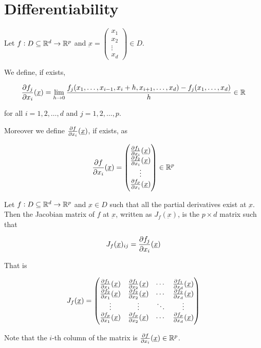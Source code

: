 \documentclass[12pt]{report}
\renewcommand{\vec}[1]{\underbar{\ensuremath{#1}}}
\begin{document}
\section{Differentiability}

\begin{definition}
    Let $f: D \subseteq \mathbb{R}^d \to \mathbb{R}^p$ and $\vec{x} = \begin{pmatrix} x_1 \\ x_2 \\ \vdots \\ x_d \end{pmatrix} \in D$.

    We define, if exists,

    $$
        \pdv{f_j}{x_i}()(\vec{x}) = \lim_{h \to 0} \frac{f_j(x_1, \ldots, x_{i-1}, x_i + h, x_{i+1}, \ldots, x_d) - f_j(x_1, \ldots, x_d)}{h} \in \R
    $$

    for all $i = 1, 2, \ldots, d$ and $j = 1, 2, \ldots, p$.

    Moreover we define $\pdv{f}{x_i}()(\vec{x})$, if exists, as

    $$
        \pdv{f}{x_i}()(\vec{x}) = \begin{pmatrix}
            \pdv{f_1}{x_i}()(\vec{x}) \\
            \pdv{f_2}{x_i}()(\vec{x}) \\
            \vdots                    \\
            \pdv{f_p}{x_i}()(\vec{x})
        \end{pmatrix} \in \R^p
    $$
\end{definition}

\begin{definition}
    Let $f: D \subseteq \mathbb{R}^d \to \mathbb{R}^p$ and $\vec{x} \in D$ such that all the partial derivatives exist at $\vec{x}$.
    Then the Jacobian matrix of $f$ at $\vec{x}$, written as $J_f(\vec{x})$, is the $p \times d$ matrix such that

    $$
        J_f(\vec{x})_{ij} = \pdv{f_j}{x_i}()(\vec{x})
    $$

    That is

    $$
        J_f(\vec{x}) = \begin{pmatrix}
            \pdv{f_1}{x_1}()(\vec{x}) & \pdv{f_1}{x_2}()(\vec{x}) & \cdots & \pdv{f_1}{x_d}()(\vec{x}) \\
            \pdv{f_2}{x_1}()(\vec{x}) & \pdv{f_2}{x_2}()(\vec{x}) & \cdots & \pdv{f_2}{x_d}()(\vec{x}) \\
            \vdots                    & \vdots                    & \ddots & \vdots                    \\
            \pdv{f_p}{x_1}()(\vec{x}) & \pdv{f_p}{x_2}()(\vec{x}) & \cdots & \pdv{f_p}{x_d}()(\vec{x})
        \end{pmatrix}
    $$

    Note that the $i$-th column of the matrix is $\pdv{f}{x_i}()(\vec{x}) \in \R^p$.
\end{definition}
\end{document}

